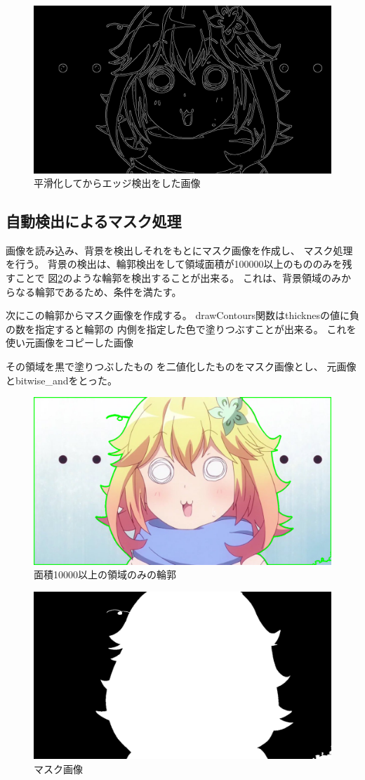 \documentclass[dvipdfmx]{jsarticle}
\begin{document}
\begin{figure}[htbp]
  \centering
  \includegraphics[width=0.7\hsize]{../pic/canny2.png}
  \caption{平滑化してからエッジ検出をした画像}
  \label{fig:canny2}
\end{figure}

\newpage
\subsection{自動検出によるマスク処理}

画像を読み込み、背景を検出しそれをもとにマスク画像を作成し、
マスク処理を行う。
背景の検出は、輪郭検出をして領域面積が100000以上のもののみを残すことで
図\ref{fig:contour_large}のような輪郭を検出することが出来る。
これは、背景領域のみからなる輪郭であるため、条件を満たす。

次にこの輪郭からマスク画像を作成する。
drawContours関数はthicknesの値に負の数を指定すると輪郭の
内側を指定した色で塗りつぶすことが出来る。
これを使い元画像をコピーした画像

その領域を黒で塗りつぶしたもの
を二値化したものをマスク画像とし、
元画像とbitwise\_andをとった。

\begin{figure}[H]
  \centering
  \includegraphics[width=0.7\hsize]{../pic/contour_large.png}
  \caption{面積10000以上の領域のみの輪郭}
  \label{fig:contour_large}
\end{figure}

\begin{figure}[H]
  \centering
  \includegraphics[width=0.7\hsize]{../pic/silhouette.png}
  \caption{マスク画像}
  \label{fig:mask}
\end{figure}
\end{document}
